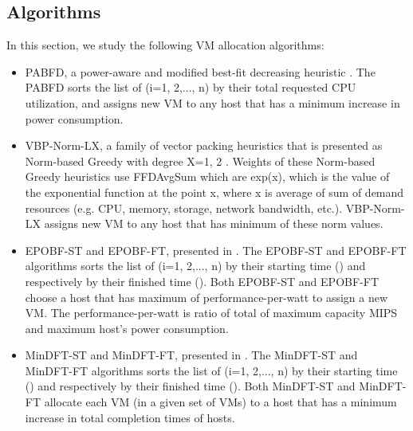 \subsection{Algorithms}

In this section, we study the following VM allocation algorithms:

\begin{itemize}
\item
PABFD, a power-aware and modified best-fit decreasing heuristic \cite{Beloglazov2011}\cite{Beloglazov2012}.
The PABFD sorts the  list of  (i=1, 2,..., n) by
their total requested CPU utilization, and 
assigns new VM to any host that has a minimum increase in power consumption.

\item
VBP-Norm-LX, a family of vector packing heuristics that
is presented as Norm-based Greedy with degree X={1, 2} \cite{Panigrahy2011}.
Weights of these Norm-based Greedy heuristics use FFDAvgSum which are exp(x), which is the value of the exponential function at the point x, where x is 
average of sum of demand resources (e.g. CPU, memory, storage, network bandwidth, etc.).
VBP-Norm-LX assigns new VM to any host that has minimum of these norm values.


\item
EPOBF-ST and EPOBF-FT, presented in \cite{Quang-Hung2014}. The EPOBF-ST and EPOBF-FT algorithms sorts the list of  (i=1, 2,..., n) by their starting time () and respectively by their finished time (). Both EPOBF-ST and EPOBF-FT choose a host that has maximum of performance-per-watt to assign a new VM. The performance-per-watt is ratio of total of maximum capacity MIPS and maximum host's power consumption.

\item
MinDFT-ST and MinDFT-FT, presented in \cite{HungFDSE2014}. The MinDFT-ST and MinDFT-FT algorithms sorts the list of  (i=1, 2,..., n) by their starting time () and respectively by their finished time (). Both MinDFT-ST and MinDFT-FT allocate each VM (in a given set of VMs) to a host that has a minimum increase in total completion times of hosts.


\end{itemize}
